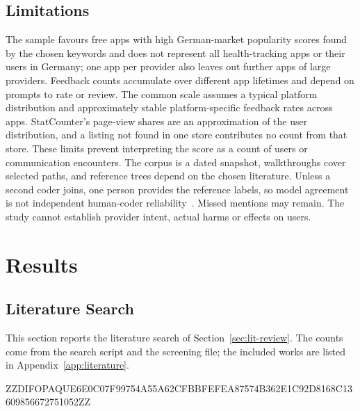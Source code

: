 \documentclass[twoside,its]{bossthesis}
\begin{document}
\section{Limitations} The sample favours free apps with high German-market
popularity scores found by the chosen keywords and does not represent all
health-tracking apps or their users in Germany; one app per provider also
leaves out further apps of large providers. Feedback counts accumulate over
different app lifetimes and depend on prompts to rate or review. The common
scale assumes a typical platform distribution and approximately stable
platform-specific feedback rates across apps. StatCounter's page-view shares
are an approximation of the user distribution, and a listing not found in one
store contributes no count from that store. These limits prevent interpreting
the score as a count of users or communication encounters. The corpus is a
dated snapshot, walkthroughs cover selected paths, and reference trees depend
on the chosen literature. Unless a second coder joins, one person provides the
reference labels, so model agreement is not independent human-coder
reliability~\parencite{mcdonald2019reliability}. Missed mentions may remain.
The study cannot establish provider intent, actual harms or effects on users.



\chapter{Results}
\label{ch:results}


\section{Literature Search}
\label{sec:results-lit}
This section reports the literature search of Section~\ref{sec:lit-review}.
The counts come from the search script and the screening file; the included
works are listed in Appendix~\ref{app:literature}.



ZZDIFOPAQUE6E0C07F99754A55A62CFBBFEFEA87574B362E1C92D8168C13609856672751052ZZ
\end{document}
